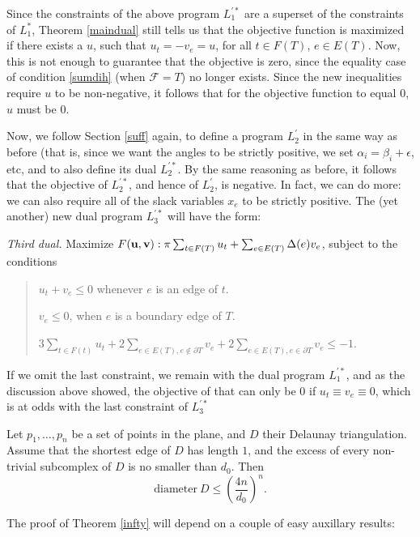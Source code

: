 \documentclass{acmart}
\newcommand{\thm}[2]{\begin{#1} #2 \end{#1}}
\newcommand{\diameter}{\mathrm{diameter\:}}
\begin{document}
{Since the constraints of the above program $L_1^{\prime *}$ are a
superset of the constraints of $L_1^*$, Theorem \ref{maindual} still
tells us that the objective function is maximized if there exists a
$u$, such that $u_t = - v_e = u$, for all $t\in F(T)$, $e\in
E(T)$. Now, this is not enough to guarantee that the 
objective is zero, since the equality case of condition \ref{sumdih}
(when $\mathcal{F} = T$) no longer exists. Since the new inequalities
require $u$ to be non-negative, it follows that for the objective
function to equal $0$, $u$ must be $0$. 

Now, we follow Section \ref{suff} again, to define a program
$L_2^\prime$ in the same way as before (that is, since we want the
angles to be strictly positive, we set $\alpha_i = \beta_i+\epsilon$, etc,
and to also define its dual $L_2^{\prime *}$. By the same reasoning as
before, it follows that the objective of $L_2^{\prime *}$, and hence
of $L_2^\prime$, is negative. In fact, we can do more: we can also
require all of the slack variables $x_e$ to be strictly positive. The
(yet another) new dual program $L_3^{\prime *}$ will have the form:

\medskip\noindent
\textit{Third dual.}
Maximize $F({\bf u}, {\bf v}):\pi \sum_{t \in F(T)} u_t + \sum_{e\in E(T)} \Delta(e)v_e$,
subject to the conditions
\begin{quote}

$u_t+v_e\leq 0$ whenever $e$ is an edge of $t$.

$v_e \leq 0$, when $e$ is a boundary edge of $T$.

$3  \sum_{t \in F(t)} u_t + 
2 \sum_{e\in E(T), e\notin \partial T} v_e + 
2 \sum_{e\in E(T), e \in \partial T} v_e \leq -1$.
\end{quote}

If we omit the last constraint, we remain with the dual program
$L_1^{\prime *}$, and as the discussion above showed, the objective of
that can only be $0$ if $u_t \equiv v_e \equiv 0$, which is at odds
with the last constraint of $L_3^{\prime *}$
}

\thm{theorem}
{
\label{infty}
Let $p_1, \ldots, p_n$ be a set of points in the plane, and $D$ their
Delaunay triangulation. Assume that the shortest edge of $D$ has
length $1$, and the excess of every non-trivial subcomplex of $D$ is
no smaller than $d_0$. Then
$$
\diameter D \leq \left(\frac{4 n}{d_0}\right)^n.
$$
}

The proof of Theorem \ref{infty} will depend on a couple of easy
auxillary results:
\end{document}
